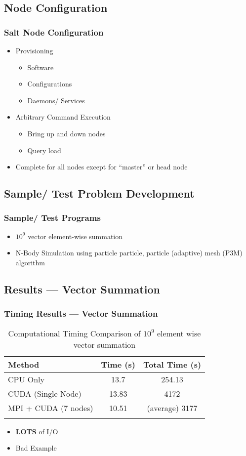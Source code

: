 \documentclass{beamer}
\begin{document}
\subsection{Node Configuration}
\begin{frame}
\frametitle{Salt Node Configuration}
\begin{itemize}
\item{Provisioning}
\begin{itemize}
\item{Software}
\item{Configurations}
\item{Daemons/ Services}
\end{itemize}
\item{Arbitrary Command Execution}
\begin{itemize}
\item{Bring up and down nodes}
\item{Query load}
\end{itemize}
\item{Complete for all nodes except for ``master'' or head node}
\end{itemize}
\end{frame}
\subsection{Sample/ Test Problem Development}
\begin{frame}
\frametitle{Sample/ Test Programs}
\begin{itemize}
\item{$ 10^{9} $ vector element-wise summation}
\item{N-Body Simulation using particle particle, particle (adaptive) mesh (P3M)
      algorithm}
\end{itemize}
\end{frame}
\subsection{Results --- Vector Summation}
\begin{frame}
\frametitle{Timing Results --- Vector Summation}
\begin{table}[htb]
\centering{}
\begin{tabular}{lcc}
\toprule{}
\textbf{Method} & \textbf{Time (s)} & \textbf{Total Time (s)} \\
\midrule{}
CPU Only & 13.7 & 254.13 \\
\midrule{}
CUDA (Single Node) & 13.83 & 4172 \\
\midrule{}
MPI + CUDA (7 nodes) & 10.51 & (average) 3177 \\
\bottomrule{}
\end{tabular}
\caption{Computational Timing Comparison of $ 10^9 $ element wise vector
summation}
\end{table}
\begin{itemize}
\item{\textbf{LOTS} of I/O}
\item{Bad Example}
\end{itemize}
\end{frame}
\end{document}
